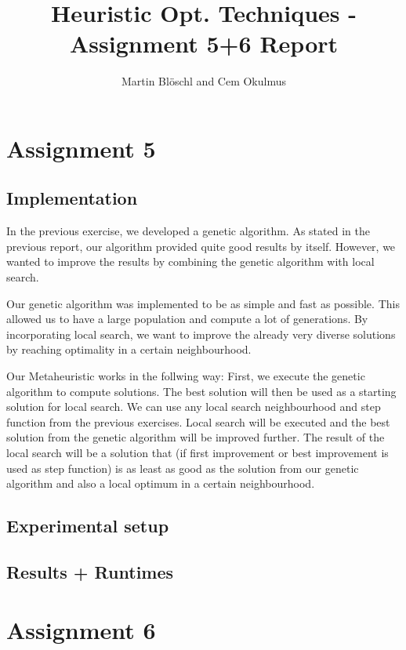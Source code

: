 \documentclass [11pt]{article}
\begin{document}
\title{ Heuristic Opt. Techniques - Assignment 5+6 Report}
\author{ Martin Blöschl and Cem Okulmus }

\maketitle
\thispagestyle{empty}


\section{Assignment 5}


\subsection{Implementation}

In the previous exercise, we developed a genetic algorithm. As stated in the previous report, our algorithm provided quite good results by itself. However, we wanted to improve the results by combining the genetic algorithm with local search.

Our genetic algorithm was implemented to be as simple and fast as possible. This allowed us to have a large population and compute a lot of generations. By incorporating local search, we want to improve the already very diverse solutions by reaching optimality in a certain neighbourhood.

Our Metaheuristic works in the follwing way: First, we execute the genetic algorithm to compute solutions. The best solution will then be used as a starting solution for local search. We can use any local search neighbourhood and step function from the previous exercises. Local search will be executed and the best solution from the genetic algorithm will be improved further. The result of the local search will  be a solution that (if first improvement or best improvement is used as step function) is as least as good as the solution from our genetic algorithm and also a local optimum in a certain neighbourhood.


\subsection{Experimental setup}



\subsection{Results + Runtimes}



\section{Assignment 6}
\end{document}
